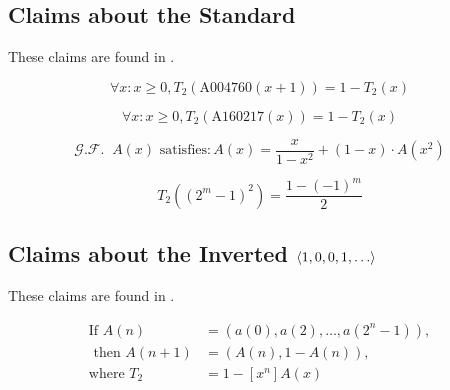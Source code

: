 \documentclass[conference]{IEEEtran}
\begin{document}
\subsection{Claims about the Standard \TMS}

These claims are found in \cite{OEIS-TMS}.

\begin{conjecture}
    \begin{equation}    
    \forall x : x\ge 0, T_2(\text{A004760}(x+1)) = 1 - T_2(x)
    \end{equation}
\end{conjecture}

\begin{conjecture}
    \begin{equation}
        \forall x : x \ge 0, T_2(\text{A160217}(x)) = 1 - T_2(x)
    \end{equation}
\end{conjecture}

\begin{conjecture}
    \begin{equation}
        \mathcal{G.F.}\;\; A(x) \text{ satisfies}: A(x) = \dfrac{x}{1 - x^2} + (1 - x) \cdot A(x^2)
    \end{equation}
\end{conjecture}

\begin{conjecture}
    \begin{equation}
         T_2((2^m-1)^2) = \dfrac{1-(-1)^m}{2}
    \end{equation}
\end{conjecture}

\subsection{Claims about the Inverted \TMS $\tuple{1, 0, 0, 1, \dots}$}

These claims are found in \cite{OEIS-TMS-inv}.

\begin{conjecture}
    \begin{equation}
    \begin{aligned}
        \text{If } A(n) &= (a(0),a(2),\dots,a(2^n-1)), \\
        \text{ then } A(n+1) &= (A(n),1-A(n)), \\
        \text{where } T_2 &= 1 - [x^n]A(x)
    \end{aligned}
    \end{equation}
\end{conjecture}
\end{document}
